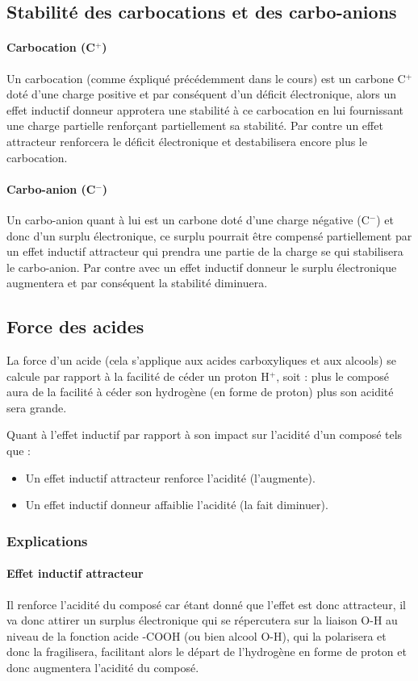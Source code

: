 \documentclass[a4paper, oneside]{book}
\begin{document}
\subsection{Stabilité des carbocations et des carbo-anions}
\paragraph{Carbocation (C$^+$)}

Un carbocation (comme éxpliqué précédemment dans le cours) est un carbone C$^+$ doté d'une charge positive et par conséquent d'un déficit électronique, alors un effet inductif donneur approtera une stabilité à ce carbocation en lui fournissant une charge partielle renforçant partiellement sa stabilité. Par contre un effet attracteur renforcera le déficit électronique et destabilisera encore plus le carbocation.
\paragraph{Carbo-anion (C$^-$)}

Un carbo-anion quant à lui est un carbone doté d'une charge négative (C$^-$) et donc d'un surplu électronique, ce surplu pourrait être compensé partiellement par un effet inductif attracteur qui prendra une partie de la charge se qui stabilisera le carbo-anion. Par contre avec un effet inductif donneur le surplu électronique augmentera et par conséquent la stabilité diminuera. 
\subsection{Force des acides}
La force d'un acide (cela s'applique aux acides carboxyliques et aux alcools) se calcule par rapport à la facilité de céder un proton H$^+$, soit : plus le composé aura de la facilité à céder son hydrogène (en forme de proton) plus son acidité sera grande. 

Quant à l'effet inductif par rapport à son impact sur l'acidité d'un composé tels que : 
\begin{itemize}
    \item Un effet inductif attracteur renforce l'acidité (l'augmente).
    \item Un effet inductif donneur affaiblie l'acidité (la fait diminuer).
\end{itemize}
\subsubsection{Explications}
\paragraph{Effet inductif attracteur}
Il renforce l'acidité du composé car étant donné que l'effet est donc attracteur, il va donc attirer un surplus électronique qui se répercutera sur la liaison O-H au niveau de la fonction acide -COOH (ou bien alcool O-H), qui la polarisera et donc la fragilisera, facilitant alors le départ de l'hydrogène en forme de proton et donc augmentera l'acidité du composé.
\end{document}
